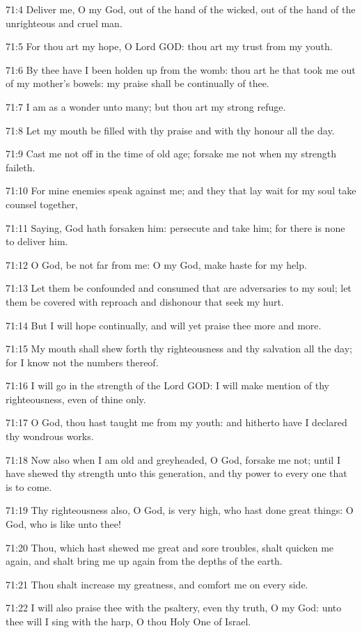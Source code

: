 71:4 Deliver me, O my God, out of the hand of the wicked, out of the
hand of the unrighteous and cruel man.

71:5 For thou art my hope, O Lord GOD: thou art my trust from my
youth.

71:6 By thee have I been holden up from the womb: thou art he that
took me out of my mother's bowels: my praise shall be continually of
thee.

71:7 I am as a wonder unto many; but thou art my strong refuge.

71:8 Let my mouth be filled with thy praise and with thy honour all
the day.

71:9 Cast me not off in the time of old age; forsake me not when my
strength faileth.

71:10 For mine enemies speak against me; and they that lay wait for my
soul take counsel together,

71:11 Saying, God hath forsaken him: persecute and take him; for there
is none to deliver him.

71:12 O God, be not far from me: O my God, make haste for my help.

71:13 Let them be confounded and consumed that are adversaries to my
soul; let them be covered with reproach and dishonour that seek my
hurt.

71:14 But I will hope continually, and will yet praise thee more and
more.

71:15 My mouth shall shew forth thy righteousness and thy salvation
all the day; for I know not the numbers thereof.

71:16 I will go in the strength of the Lord GOD: I will make mention
of thy righteousness, even of thine only.

71:17 O God, thou hast taught me from my youth: and hitherto have I
declared thy wondrous works.

71:18 Now also when I am old and greyheaded, O God, forsake me not;
until I have shewed thy strength unto this generation, and thy power
to every one that is to come.

71:19 Thy righteousness also, O God, is very high, who hast done great
things: O God, who is like unto thee!

71:20 Thou, which hast shewed me great and sore troubles, shalt
quicken me again, and shalt bring me up again from the depths of the
earth.

71:21 Thou shalt increase my greatness, and comfort me on every side.

71:22 I will also praise thee with the psaltery, even thy truth, O my
God: unto thee will I sing with the harp, O thou Holy One of Israel.

